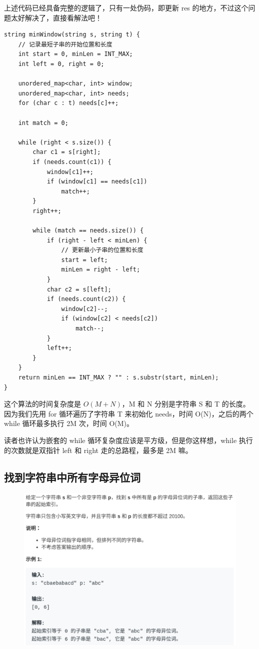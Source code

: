 \documentclass[12pt]{article}
\begin{document}
上述代码已经具备完整的逻辑了，只有一处伪码，即更新 res 的地方，不过这个问题太好解决了，直接看解法吧！
\begin{lstlisting}
string minWindow(string s, string t) {
    // 记录最短子串的开始位置和长度
    int start = 0, minLen = INT_MAX;
    int left = 0, right = 0;
    
    unordered_map<char, int> window;
    unordered_map<char, int> needs;
    for (char c : t) needs[c]++;
    
    int match = 0;
    
    while (right < s.size()) {
        char c1 = s[right];
        if (needs.count(c1)) {
            window[c1]++;
            if (window[c1] == needs[c1]) 
                match++;
        }
        right++;
        
        while (match == needs.size()) {
            if (right - left < minLen) {
                // 更新最小子串的位置和长度
                start = left;
                minLen = right - left;
            }
            char c2 = s[left];
            if (needs.count(c2)) {
                window[c2]--;
                if (window[c2] < needs[c2])
                    match--;
            }
            left++;
        }
    }
    return minLen == INT_MAX ? "" : s.substr(start, minLen);
}
\end{lstlisting}

这个算法的时间复杂度是 $O(M + N)$，M 和 N 分别是字符串 S 和 T 的长度。因为我们先用 for 循环遍历了字符串 T 来初始化 needs，时间 O(N)，之后的两个 while 循环最多执行 2M 次，时间 O(M)。

读者也许认为嵌套的 while 循环复杂度应该是平方级，但是你这样想，while 执行的次数就是双指针 left 和 right 走的总路程，最多是 2M 嘛。

\subsection{找到字符串中所有字母异位词}
\begin{figure}[H]
    \centering
    \includegraphics[width=.8\textwidth]{fig/Sliding_Window_6.png}
\end{figure}
\end{document}
